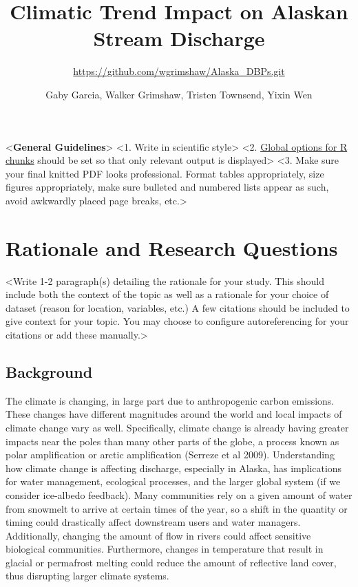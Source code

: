 \documentclass[12pt,]{article}
\title{Climatic Trend Impact on Alaskan Stream Discharge}
\subtitle{\url{https://github.com/wgrimshaw/Alaska_DBPs.git}}
\author{Gaby Garcia, Walker Grimshaw, Tristen Townsend, Yixin Wen}
\date{}
\begin{document}
\maketitle

\newpage

\textless{}\textbf{General Guidelines}\textgreater{} \textless{}1. Write
in scientific style\textgreater{} \textless{}2.
\href{https://rmarkdown.rstudio.com/lesson-3.html}{Global options for R
chunks} should be set so that only relevant output is
displayed\textgreater{} \textless{}3. Make sure your final knitted PDF
looks professional. Format tables appropriately, size figures
appropriately, make sure bulleted and numbered lists appear as such,
avoid awkwardly placed page breaks, etc.\textgreater{}

\hypertarget{rationale-and-research-questions}{%
\section{Rationale and Research
Questions}\label{rationale-and-research-questions}}

\textless{}Write 1-2 paragraph(s) detailing the rationale for your
study. This should include both the context of the topic as well as a
rationale for your choice of dataset (reason for location, variables,
etc.) A few citations should be included to give context for your topic.
You may choose to configure autoreferencing for your citations or add
these manually.\textgreater{}

\hypertarget{background}{%
\subsection{Background}\label{background}}

The climate is changing, in large part due to anthropogenic carbon
emissions. These changes have different magnitudes around the world and
local impacts of climate change vary as well. Specifically, climate
change is already having greater impacts near the poles than many other
parts of the globe, a process known as polar amplification or arctic
amplification (Serreze et al 2009). Understanding how climate change is
affecting discharge, especially in Alaska, has implications for water
management, ecological processes, and the larger global system (if we
consider ice-albedo feedback). Many communities rely on a given amount
of water from snowmelt to arrive at certain times of the year, so a
shift in the quantity or timing could drastically affect downstream
users and water managers. Additionally, changing the amount of flow in
rivers could affect sensitive biological communities. Furthermore,
changes in temperature that result in glacial or permafrost melting
could reduce the amount of reflective land cover, thus disrupting larger
climate systems.
\end{document}
